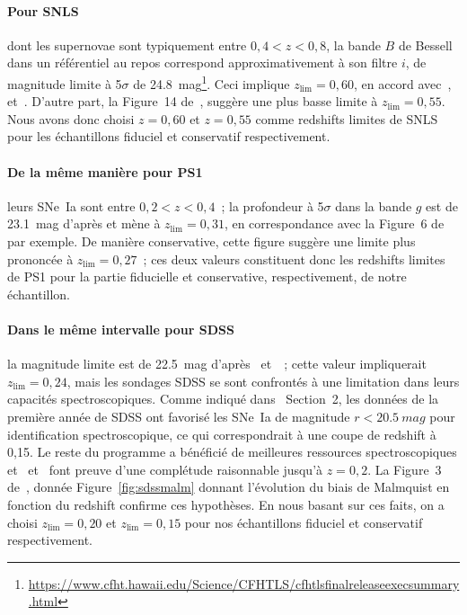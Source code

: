 \documentclass[../main/main.tex]{subfiles}
\begin{document}
\paragraph*{Pour SNLS} dont les supernovae sont typiquement entre $0,4 < z <
0,8$, la bande $B$ de Bessell dans un référentiel au repos correspond
approximativement à son filtre $i$, de magnitude limite à 5$\sigma$ de
\SI{24,8}{mag}\footnote{\href{
    https://www.cfht.hawaii.edu/Science/CFHTLS/cfhtlsfinalreleaseexecsummary.html}
{https://www.cfht.hawaii.edu/Science/CFHTLS/cfhtlsfinalreleaseexecsummary.html}}.
Ceci implique $z_{\lim} = 0,60$, en accord avec~\cite{neill2006, perrett2010},
et~\citep[Section~2,2]{conley2011}. D'autre part, la Figure~14
de~\cite{perrett2010}, suggère une plus basse limite à $z_{\lim} = 0,55$. Nous
avons donc choisi $z=0,60$ et $z=0,55$ comme redshifts limites de SNLS pour les
échantillons fiduciel et conservatif respectivement.

\paragraph*{De la même manière pour PS1} leurs SNe~Ia sont entre $0,2 < z <
0,4$~; la profondeur à 5$\sigma$ dans la bande $g$ est de \SI{23,1}{mag} d'après
\cite{rest2014} et mène à $z_{\lim}=0,31$, en correspondance avec la Figure~6
de~\cite{scolnic2018} par exemple. De manière conservative, cette figure
suggère une limite plus prononcée à $z_{\lim}=0,27$~; ces deux valeurs
constituent donc les redshifts limites de PS1 pour la partie fiducielle et
conservative, respectivement, de notre échantillon.

\paragraph*{Dans le même intervalle pour SDSS} la magnitude limite est de
\SI{22,5}{mag} d'après~\cite{dilday2008} et~\cite{sako2008}~; cette valeur 
impliquerait $z_{\lim}=0,24$, mais les sondages SDSS se sont confrontés à une
limitation dans leurs capacités spectroscopiques. Comme indiqué
dans~\cite{kessler2009a} Section~2, les données de la première année de SDSS ont
favorisé les SNe~Ia de magnitude $r < \SI{20,5}{mag}$ pour identification
spectroscopique, ce qui correspondrait à une coupe de redshift à 0,15. Le reste
du programme a bénéficié de meilleures ressources spectroscopiques
et~\cite{kessler2009a} et~\cite{dilday2008} font preuve d'une complétude
raisonnable jusqu'à $z=0,2$. La Figure~3 de~\cite{conley2011}, donnée
Figure~\ref{fig:sdssmalm} donnant l'évolution du biais de Malmquist en fonction
du redshift confirme ces hypothèses. En nous basant sur ces faits, on a choisi
$z_{\lim}=0,20$ et $z_{\lim}=0,15$ pour nos échantillons fiduciel et conservatif
respectivement.
\end{document}
